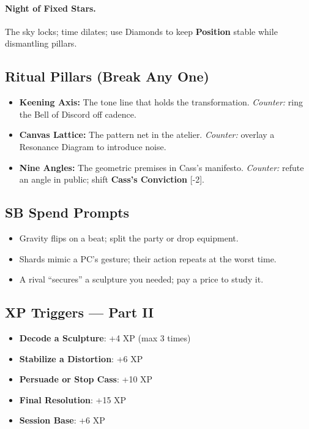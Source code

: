 \documentclass[11pt]{article}
\newcommand{\Clock}[2]{\textbf{#1} [#2]}
\newcommand{\Term}[1]{\textbf{#1}}
\newcommand{\Position}{\Term{Position}}
\newcommand{\SB}{\Term{SB}}
\begin{document}
\paragraph{Night of Fixed Stars.} The sky locks; time dilates; use Diamonds to keep \Position{} stable while dismantling pillars.

\subsection*{Ritual Pillars (Break Any One)}
\begin{itemize}
\item \textbf{Keening Axis:} The tone line that holds the transformation. \emph{Counter:} ring the Bell of Discord off cadence.
\item \textbf{Canvas Lattice:} The pattern net in the atelier. \emph{Counter:} overlay a Resonance Diagram to introduce noise.
\item \textbf{Nine Angles:} The geometric premises in Cass's manifesto. \emph{Counter:} refute an angle in public; shift \Clock{Cass's Conviction}{-2}.
\end{itemize}

\subsection*{\SB{} Spend Prompts}
\begin{itemize}
\item Gravity flips on a beat; split the party or drop equipment.
\item Shards mimic a PC's gesture; their action repeats at the worst time.
\item A rival ``secures'' a sculpture you needed; pay a price to study it.
\end{itemize}

\subsection*{XP Triggers --- Part II}
\begin{itemize}
\item \textbf{Decode a Sculpture}: +4 XP (max 3 times)
\item \textbf{Stabilize a Distortion}: +6 XP
\item \textbf{Persuade or Stop Cass}: +10 XP
\item \textbf{Final Resolution}: +15 XP
\item \textbf{Session Base}: +6 XP
\end{itemize}
\end{document}
